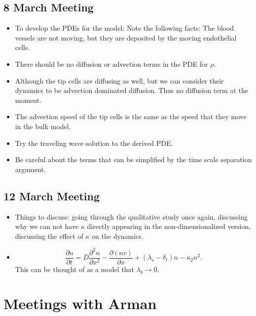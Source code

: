 \subsection{8 March Meeting}
\begin{itemize}
	\item To develop the PDEs for the model: Note the following facts: The blood vessels are not moving, but they are deposited by the moving endothelial cells.
	\item There should be no diffusion or advection terms in the PDE for $ \rho $.
	\item Although the tip cells are diffusing as well, but we can consider their dynamics to be advection dominated diffusion. Thus no diffusion term at the moment.
	\item The advection speed of the tip cells is the same as the speed that they move in the bulk model.
	\item Try the traveling wave solution to the derived PDE.
	\item Be careful about the terms that can be simplified by the time scale separation argument. 
\end{itemize}

\subsection{12 March Meeting}
\begin{itemize}
	\item Things to discuss: going through the qualitative study once again, discussing why we can not have $ \kappa $ directly appearing in the non-dimensionalized version, discussing the effect of $ \kappa $ on the dynamics.
	
	\item 
	\[ \frac{\partial n}{\partial t} = D \frac{\partial^2 n}{\partial x^2} - \frac{\partial(nv)}{\partial x} + (\lambda_s - \delta_t)n - \kappa_2 n^2. \]
	This can be thought of as a model that $ \lambda_b \to 0 $.
\end{itemize}

\section{Meetings with Arman}